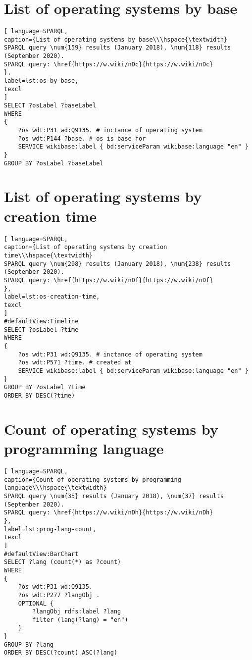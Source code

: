 \section{List of operating systems by base}

\begin{lstlisting}[ language=SPARQL, 
caption={List of operating systems by base\\\hspace{\textwidth}
SPARQL query \num{159} results (January 2018), \num{118} results (September 2020).
SPARQL query: \href{https://w.wiki/nDc}{https://w.wiki/nDc}
},
label=lst:os-by-base,
texcl 
]
SELECT ?osLabel ?baseLabel
WHERE
{
	?os wdt:P31 wd:Q9135. # inctance of operating system
	?os wdt:P144 ?base. # os is base for 
	SERVICE wikibase:label { bd:serviceParam wikibase:language "en" }
}
GROUP BY ?osLabel ?baseLabel
\end{lstlisting}

\section{List of operating systems by creation time}


\begin{lstlisting}[ language=SPARQL, 
caption={List of operating systems by creation time\\\hspace{\textwidth}
SPARQL query \num{298} results (January 2018), \num{238} results (September 2020).
SPARQL query: \href{https://w.wiki/nDf}{https://w.wiki/nDf}
},
label=lst:os-creation-time,
texcl 
]
#defaultView:Timeline
SELECT ?osLabel ?time
WHERE
{
	?os wdt:P31 wd:Q9135. # inctance of operating system
	?os wdt:P571 ?time. # created at
	SERVICE wikibase:label { bd:serviceParam wikibase:language "en" }
}
GROUP BY ?osLabel ?time
ORDER BY DESC(?time)
\end{lstlisting}

\section{Count of operating systems by programming language}

\begin{lstlisting}[ language=SPARQL, 
caption={Count of operating systems by programming language\\\hspace{\textwidth}
SPARQL query \num{35} results (January 2018), \num{37} results (September 2020).
SPARQL query: \href{https://w.wiki/nDh}{https://w.wiki/nDh}
},
label=lst:prog-lang-count,
texcl 
]
#defaultView:BarChart
SELECT ?lang (count(*) as ?count)
WHERE 
{
	?os wdt:P31 wd:Q9135.
	?os wdt:P277 ?langObj .
	OPTIONAL {
		?langObj rdfs:label ?lang
		filter (lang(?lang) = "en")
	}
}
GROUP BY ?lang
ORDER BY DESC(?count) ASC(?lang)
\end{lstlisting}

